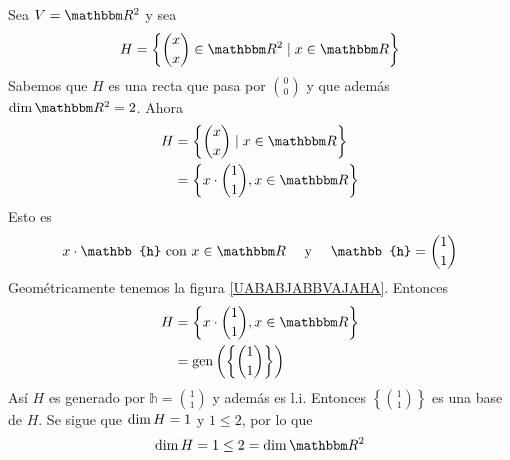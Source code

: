 \begin{example}
    Sea $V = \RR[2]$ y sea
    $$\displaystyle H = \left\{ \binom{x}{x} \in \RR[2] \mid x \in \RR \right\}$$
    Sabemos que $H$ es una recta que pasa por $\displaystyle \binom{0}{0}$ y que además $\Dim \RR[2] = 2$. Ahora
    \begin{align*}
        H & = \left\{ \binom{x}{x} \mid x \in \RR \right\} \\
        & = \left\{ x \cdot \binom{1}{1},  x \in \RR \right\}
    \end{align*}
    Esto es
    $$x \cdot \mathbb{h} \text{ con } x \in \RR \quad \text{ y } \quad \mathbb{h} = \binom{1}{1}$$
     Geométricamente tenemos la figura \ref{UABABJABBVAJAHA}. Entonces
    \begin{align*}
        H & = \left\{ x \cdot \binom{1}{1},  x \in \RR \right\} \\
        & = \Gen \left( \left\{ \binom{1}{1} \right\} \right)
    \end{align*}
    Así $H$ es generado por $\displaystyle \mathbb{h} = \binom{1}{1}$ y además es l.i. Entonces $\displaystyle \left\{ \binom{1}{1} \right\}$ es una base de $H$. Se sigue que $\operatorname{dim} H = 1$ y $1 \leq 2$, por lo que
    $$\Dim H = 1 \leq 2 = \Dim \RR[2]$$
\end{example}

